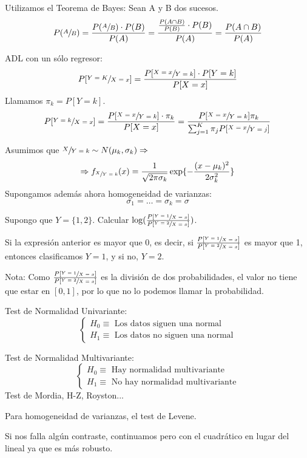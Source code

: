 \documentclass[11pt,a4paper]{article}
\begin{document}
Utilizamos el Teorema de Bayes: Sean A y B dos sucesos.
$$P(\sfrac{A}{B}) = \frac{P(\sfrac{A}{B}) \cdot P(B)}{P(A)} = \frac{\frac{P(A \cap B)}{P(B)} \cdot P(B)}{P(A)} = \frac{P(A \cap B)}{P(A)}$$

ADL con un sólo regresor:
$$P[\sfrac{Y=K}{X=x}] = \frac{P[\sfrac{X=x}{Y=k}] \cdot P[Y=k]}{P[X=x]}$$
Llamamos $\pi_{k} = P[Y=k]$.
$$P[\sfrac{Y=k}{X=x}] = \frac{P[\sfrac{X=x}{Y=k}] \cdot \pi_{k}}{P[X=x]} = \frac{P[\sfrac{X=x}{Y=k}]\pi_{k}}{\sum_{j=1}^{K} \pi_{j} P[\sfrac{X=x}{Y=j}]}$$

Asumimos que $\sfrac{X}{Y=k} \sim N(\mu_{k}, \sigma_{k}) \Rightarrow$
$$\Rightarrow f_{\sfrac{X}{Y=k}}(x) = \frac{1}{\sqrt{2\pi\sigma_{k}}} \exp\{-\frac{(x-\mu_{k})^{2}}{2\sigma_{k}^{2}}\}$$
Supongamos además ahora homogeneidad de varianzas:
$$\sigma_{1} = \dots = \sigma_{k} = \sigma$$

Supongo que $Y = \{1, 2\}$. Calcular $\log(\frac{P[\sfrac{Y=1}{X=x}]}{P[\sfrac{Y=2}{X=x}]})$.

Si la expresión anterior es mayor que 0, es decir, si $\frac{P[\sfrac{Y=1}{X=x}]}{P[\sfrac{Y=2}{X=x}]}$ es mayor que 1, entonces clasificamos $Y=1$, y si no, $Y=2$.

Nota: Como $\frac{P[\sfrac{Y=1}{X=x}]}{P[\sfrac{Y=2}{X=x}]}$ es la división de dos probabilidades, el valor no tiene que estar en $[0,1]$, por lo que no lo podemos llamar la probabilidad.

Test de Normalidad Univariante:
$$\begin{cases}
H_{0} \equiv \text{ Los datos siguen una normal} \\
H_{1} \equiv \text{ Los datos no siguen una normal}
\end{cases}$$

Test de Normalidad Multivariante:
$$\begin{cases}
H_{0} \equiv \text{ Hay normalidad multivariante} \\
H_{1} \equiv \text{ No hay normalidad multivariante}
\end{cases}$$
Test de Mordia, H-Z, Royston...

Para homogeneidad de varianzas, el test de Levene.

Si nos falla algún contraste, continuamos pero con el cuadrático en lugar del lineal ya que es más robusto.
\end{document}
